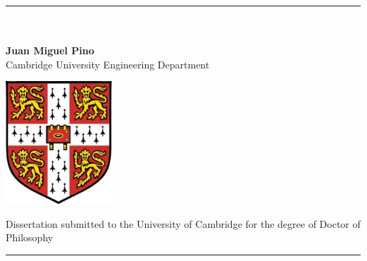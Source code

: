 \begin{titlepage}
\begin{center}
\rule{\textwidth}{1pt} \\
\vspace*{2.7cm}
 \\
\vspace*{0.8cm}
\noindent \Large \textbf{Juan Miguel Pino} \\
\vspace*{0.8cm}
Cambridge University Engineering Department \\
\vspace*{1.5cm}
\begin{center}
\includegraphics[width=4cm]{figures/shield.eps}
\end{center}
\vspace*{1.5cm}
\noindent \normalsize Dissertation submitted to the University of Cambridge for the degree of Doctor of Philosophy \\
\vfill
\rule{\textwidth}{1pt} \\
\end{center}
\end{titlepage}

